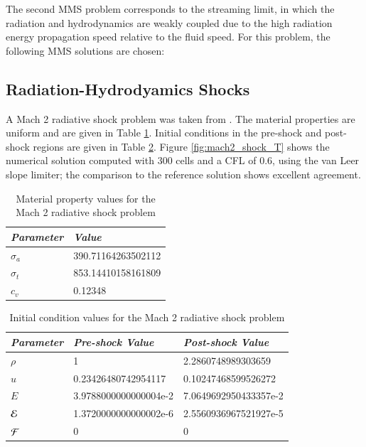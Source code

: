The second MMS problem corresponds to the streaming limit, in which the radiation
and hydrodynamics are weakly coupled due to the high radiation energy propagation
speed relative to the fluid speed. For this problem, the following MMS solutions
are chosen:


\subsection{Radiation-Hydrodyamics Shocks}
A Mach 2 radiative shock problem was taken from \cite{edwardsthesis}.
The material properties are uniform and are given in Table
\ref{tab:mach2_shock_material}. Initial conditions in the pre-shock
and post-shock regions are given in Table \ref{tab:mach2_shock_IC}.
Figure \ref{fig:mach2_shock_T} shows the numerical solution computed
with 300 cells and a CFL of 0.6, using the van Leer slope limiter;
the comparison to the reference solution shows excellent agreement.

\begin{table}[ht]
  \centering
  \caption{Material property values for the Mach 2 radiative shock problem}
  \label{tab:mach2_shock_material}
  \begin{tabular}{l l}\hline
    \emph{Parameter} & \emph{Value}\\\hline
    $\sigma_a$ & 390.71164263502112\\
    $\sigma_t$ & 853.14410158161809\\
    $c_v$      & 0.12348\\\hline
  \end{tabular}
\end{table}

\begin{table}[ht]
  \centering
  \caption{Initial condition values for the Mach 2 radiative shock problem}
  \label{tab:mach2_shock_IC}
  \begin{tabular}{l l l}\hline
    \emph{Parameter} & \emph{Pre-shock Value} & \emph{Post-shock Value}\\\hline
    $\rho$           & 1                      & 2.2860748989303659\\
    $u$              & 0.23426480742954117    & 0.10247468599526272\\
    $E$              & 3.9788000000000004e-2  & 7.0649692950433357e-2\\
    $\mathcal{E}$             & 1.3720000000000002e-6  & 2.5560936967521927e-5\\
    $\mathcal{F}$             & 0                      & 0\\\hline
  \end{tabular}
\end{table}

